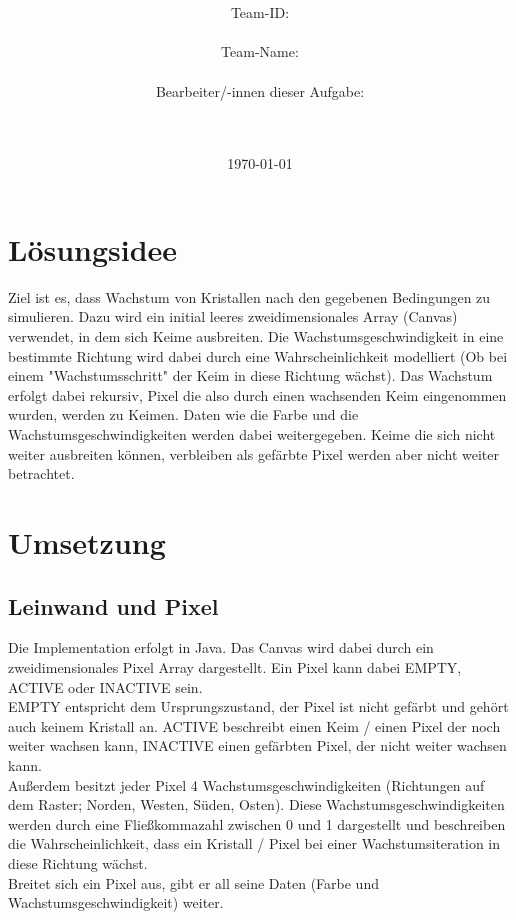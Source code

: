 \documentclass[a4paper,10pt,ngerman]{scrartcl}
\title{\textbf{\Huge\Aufgabe}}
\author{\LARGE Team-ID: \LARGE \TeamId \\\\
	    \LARGE Team-Name: \LARGE \TeamName \\\\
	    \LARGE Bearbeiter/-innen dieser Aufgabe: \\ 
	    \LARGE \Namen\\\\}
\date{\LARGE\today}
\begin{document}
\maketitle
\tableofcontents

\section{Lösungsidee}

Ziel ist es, dass Wachstum von Kristallen nach den gegebenen Bedingungen zu simulieren. Dazu wird ein initial leeres zweidimensionales Array (Canvas) verwendet, in dem sich Keime ausbreiten. Die Wachstumsgeschwindigkeit in eine bestimmte Richtung wird dabei durch eine Wahrscheinlichkeit modelliert (Ob bei einem "Wachstumsschritt" der Keim in diese Richtung wächst). Das Wachstum erfolgt dabei rekursiv, Pixel die also durch einen wachsenden Keim eingenommen wurden, werden zu Keimen. Daten wie die Farbe und die Wachstumsgeschwindigkeiten werden dabei weitergegeben. Keime die sich nicht weiter ausbreiten können, verbleiben als gefärbte Pixel werden aber nicht weiter betrachtet.


\section{Umsetzung}
\subsection{Leinwand und Pixel}
Die Implementation erfolgt in Java.
Das Canvas wird dabei durch ein zweidimensionales Pixel Array dargestellt. Ein Pixel kann dabei EMPTY, ACTIVE oder INACTIVE sein.\\
EMPTY entspricht dem Ursprungszustand, der Pixel ist nicht gefärbt und gehört auch keinem Kristall an. ACTIVE beschreibt einen Keim / einen Pixel der noch weiter wachsen kann, INACTIVE einen gefärbten Pixel, der nicht weiter wachsen kann.\\
Außerdem besitzt jeder Pixel 4 Wachstumsgeschwindigkeiten (Richtungen auf dem Raster; Norden, Westen, Süden, Osten). Diese Wachstumsgeschwindigkeiten werden durch eine Fließkommazahl zwischen 0 und 1 dargestellt und beschreiben die Wahrscheinlichkeit, dass ein Kristall / Pixel bei einer Wachstumsiteration in diese Richtung wächst. \\
Breitet sich ein Pixel aus, gibt er all seine Daten (Farbe und Wachstumsgeschwindigkeit) weiter.
\end{document}
